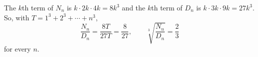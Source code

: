 The $k$th term of $N_n$ is $k\cdot2k\cdot4k=8k^3$ and the $k$th term of $D_n$ is $k\cdot3k\cdot9k=27k^3$. So, with $T=1^3+2^3+\cdots+n^3$,
\[\dfrac{N_n}{D_n}=\dfrac{8T}{27T}=\dfrac{8}{27},\qquad\sqrt[3]{\dfrac{N_n}{D_n}}=\boxed{\dfrac23}\]
for every $n$.

